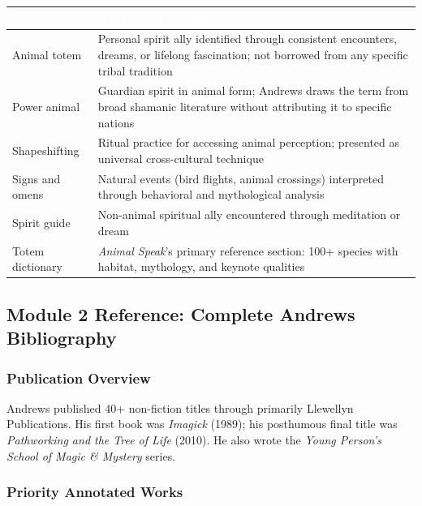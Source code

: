 \documentclass[11pt,letterpaper]{article}
\newcommand{\tableheader}[1]{\textbf{\sffamily\textcolor{white}{#1}}}
\begin{document}
\begin{center}
\begin{tabularx}{\textwidth}{L{3.5cm}X}
\toprule
{}
\tableheader{Concept} & \tableheader{Andrews' Treatment} \\
\midrule
Animal totem & Personal spirit ally identified through consistent encounters, dreams, or lifelong fascination; not borrowed from any specific tribal tradition \\
Power animal & Guardian spirit in animal form; Andrews draws the term from broad shamanic literature without attributing it to specific nations \\
Shapeshifting & Ritual practice for accessing animal perception; presented as universal cross-cultural technique \\
Signs and omens & Natural events (bird flights, animal crossings) interpreted through behavioral and mythological analysis \\
Spirit guide & Non-animal spiritual ally encountered through meditation or dream \\
Totem dictionary & \emph{Animal Speak}'s primary reference section: 100+ species with habitat, mythology, and keynote qualities \\
\bottomrule
\end{tabularx}
\end{center}

\subsection{Module 2 Reference: Complete Andrews Bibliography}

\subsubsection{Publication Overview}

Andrews published 40+ non-fiction titles through primarily Llewellyn Publications. His first book was \emph{Imagick} (1989); his posthumous final title was \emph{Pathworking and the Tree of Life} (2010). He also wrote the \emph{Young Person's School of Magic \& Mystery} series.

\subsubsection{Priority Annotated Works}
\end{document}
